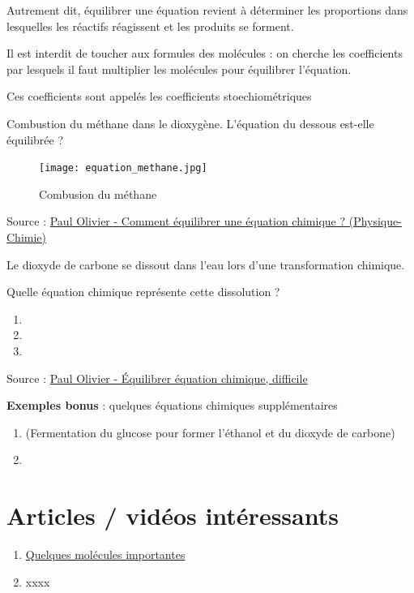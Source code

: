 \documentclass[a4paper,12pt]{article}
\begin{document}
Autrement dit, équilibrer une équation revient à déterminer les proportions dans lesquelles les réactifs réagissent et les produits se forment. \par
Il est interdit de toucher aux formules des molécules : on cherche les coefficients par lesquels il faut multiplier les molécules pour équilibrer l'équation. \par
Ces coefficients sont appelés les coefficients stoechiométriques

\begin{tcolorbox}[colback=blue!10!white, colframe=blue!75!black, title=Exemples - Application]
  Combustion du méthane dans le dioxygène. L'équation du dessous est-elle équilibrée ?
  \begin{figure}[H]
    \centering
    \texttt{[image: equation\_methane.jpg]}
    \caption{\label{} Combusion du méthane}
  \end{figure}

  Source : \href{https://www.youtube.com/watch?v=VZVBS4OwwlE&ab_channel=PaulOlivier}{Paul Olivier - Comment équilibrer une équation chimique ? (Physique-Chimie)} \par
  \vspace{1em}
  
  Le dioxyde de carbone se dissout dans l'eau lors d'une transformation chimique. \par
  Quelle équation chimique représente cette dissolution ?

  \begin{enumerate}[noitemsep]
    \item {}
    \item {}
    \item {}
  \end{enumerate}

  Source : \href{https://www.youtube.com/watch?v=KRimPPjL9xg&ab_channel=PaulOlivier}{Paul Olivier - Équilibrer équation chimique, difficile } \par

  \textbf{Exemples bonus} : quelques équations chimiques supplémentaires

  \begin{enumerate}[noitemsep]
    \item {} (Fermentation du glucose pour former l'éthanol et du dioxyde de carbone)
    \item {}
  \end{enumerate}

\end{tcolorbox}

\section{Articles / vidéos intéressants}

\begin{enumerate}[noitemsep]
  \item \href{https://www.superprof.fr/ressources/physique-chimie/physique-chimie-tous-niveaux/formule-chimique-scientifique.html}{Quelques molécules importantes}
  \item xxxx
\end{enumerate}
\end{document}
